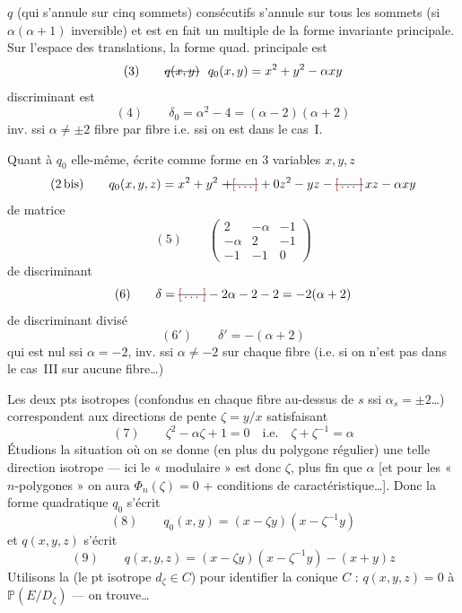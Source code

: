 \documentclass[11pt,a4paper]{article}
\begin{document}
\ill{}  $q$ (qui s'annule sur cinq sommets) consécutifs s'annule sur tous les sommets (si $\alpha(\alpha+1)$ inversible) et est en fait un multiple de la forme  invariante principale. Sur l'espace des translations, la forme quad. principale est
\[
  (3) \qquad \text{\struck{$q(x,y)$}}\ \ q_0(x,y) = x^2 + y^2 - \alpha xy
\]
  discriminant est
\[
  (4) \qquad \delta_0 = \alpha^2 - 4 = (\alpha - 2)(\alpha + 2)
\]
inv. ssi $\alpha \neq \pm 2$ fibre par fibre i.e. ssi on est dans le cas~I.

Quant à $q_0$ elle-même, écrite comme forme en 3 variables $x, y, z$
\[
  (2\,\text{bis}) \qquad q_0(x,y,z) = x^2 + y^2 \ \text{\struck{$+ \ill{}$}} + 0 z^2 - yz - \text{\struck{\ill{}}}\, xz - \alpha xy
\]
de matrice 
\[
  (5) \qquad
  \begin{pmatrix} 2 & -\alpha & -1 \\ -\alpha & 2 & -1 \\ -1 & -1 & 0 \end{pmatrix}
\]
de discriminant
\[
  (6) \qquad \delta = \text{\struck{\ill{}}} -2\alpha - 2 - 2 = -2(\alpha + 2)
\]
de discriminant divisé
\[
  (6') \qquad \delta' = -(\alpha + 2)
\]
qui est nul ssi $\alpha = -2$, inv. ssi $\alpha \neq -2$ sur chaque fibre (i.e. si on n'est pas dans le cas~III sur aucune fibre…)

Les deux pts isotropes (confondus \struck{\ill{}} en chaque fibre au-dessus de $s$ ssi $\alpha_s = \pm 2$…) correspondent aux  directions de pente $\zeta = y/x$ satisfaisant
\[
  (7) \qquad \zeta^2 - \alpha\zeta + 1 = 0 \quad \text{i.e.} \quad \zeta + \zeta^{-1} = \alpha
\]
Étudions la situation où on se donne (en plus du polygone régulier) une telle direction isotrope --- ici le  « modulaire » est donc  $\zeta$, plus fin que $\alpha$ [et pour les « \struck{\ill{}} $n$-polygones » on aura $\Phi_n(\zeta) = 0$  + conditions de caractéristique…]. Donc la forme quadratique $q_0$ s'écrit
\[
  (8) \qquad q_0(x,y) = (x - \zeta y)(x - \zeta^{-1} y)
\]
et $q(x,y,z)$ s'écrit
\[
  (9) \qquad q(x,y,z) = (x - \zeta y)(x - \zeta^{-1} y) - (x + y) z
\]
Utilisons \struck{\ill{}}  la \struck{\ill{}}  (le pt isotrope $d_\zeta \in C$) pour identifier la conique $C$ : $q(x,y,z) = 0$ à $\mathbb{P}(E/D_\zeta)$ --- on trouve…
\end{document}
